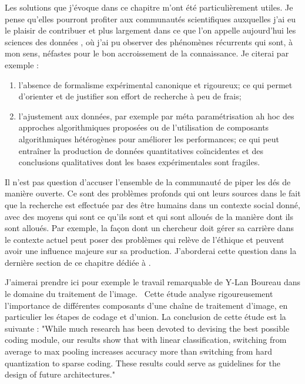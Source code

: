Les solutions que j'évoque dans ce chapitre m'ont été particulièrement utiles. Je pense qu'elles pourront profiter aux communautés scientifiques auxquelles j'ai eu le plaisir de contribuer et plus largement dans ce que l'on appelle aujourd'hui \og les sciences des données \fg, où j'ai pu observer des phénomènes récurrents qui sont, à mon sens, néfastes pour le bon accroissement de la connaissance. Je citerai par exemple :
\begin{enumerate}
  \item l'absence de formalisme expérimental canonique et rigoureux; ce qui permet d'orienter et de justifier son effort de recherche à peu de frais;
  \item l'ajustement aux données, par exemple par méta paramétrisation ah hoc des approches algorithmiques proposées ou de l'utilisation de composants algorithmiques hétérogènes pour améliorer les performances; ce qui peut entraîner la production de données quantitatives coïncidentes et des conclusions qualitatives dont les bases expérimentales sont fragiles.
\end{enumerate}

Il n'est pas question d'accuser l'ensemble de la communauté de \og piper les dés \fg de manière ouverte. Ce sont des problèmes profonds qui ont leurs sources dans le fait que la recherche est effectuée par des être humains dans un contexte social donné, avec des moyens qui sont ce qu'ils sont et qui sont alloués de la manière dont ils sont alloués. Par exemple, la façon dont un chercheur doit gérer sa carrière dans le contexte actuel peut poser des problèmes qui relève de l'éthique et peuvent avoir une influence majeure sur sa production. J'aborderai cette question dans la dernière section de ce chapitre dédiée à .


J'aimerai prendre ici pour exemple le travail remarquable de Y-Lan Boureau dans le domaine du traitement de l'image.~\cite{boureau2010learning} Cette étude analyse rigoureusement l'importance de différentes composants d'une chaîne de traitement d'image, en particulier les étapes de codage et d'union. La conclusion de cette étude est la suivante :  "While much research has been devoted to devising
the best possible coding module, our results show that with
linear classification, switching from average to max pooling
increases accuracy more than switching from hard quantization to sparse coding. These results could serve as guidelines for the design of future architectures."

